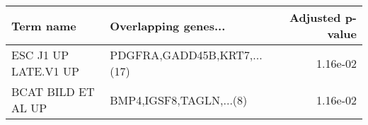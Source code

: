 \begin{tabular}{llr}
\toprule
           Term name &        Overlapping genes... &  Adjusted p-value \\
\midrule
ESC J1 UP LATE.V1 UP & PDGFRA,GADD45B,KRT7,...(17) &          1.16e-02 \\
  BCAT BILD ET AL UP &     BMP4,IGSF8,TAGLN,...(8) &          1.16e-02 \\
\bottomrule
\end{tabular}
